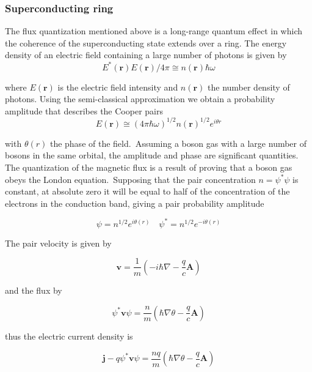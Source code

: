 \documentclass[openany,11pt,a4paper]{report}
\begin{document}
\subsubsection{Superconducting ring} 

The flux quantization mentioned above is a long-range quantum effect in which
the coherence of the superconducting state extends over a ring.
The energy density of an electric field containing a large number of photons is given by
\begin{equation}
E^{*}(\mathbf{r}) E(\mathbf{r}) / 4 \pi \cong n(\mathbf{r}) \hbar \omega
\end{equation}

where $E(\textbf{r})$ is the electric field intensity and $n(\textbf{r})$ the number density of photons. Using the semi-classical approximation we obtain a probability amplitude that describes the Cooper pairs
\begin{equation}
E(\mathbf{r}) \cong(4 \pi \hbar \omega)^{1 / 2} n(\mathbf{r})^{1 / 2} e^{i\theta r} 
\end{equation}

with $\theta(r)$ the phase of the field.\
Assuming a boson gas with a large number of bosons in the same orbital, the amplitude and phase are significant quantities. The quantization of the magnetic flux is a result of proving that a boson gas obeys the London equation.\
Supposing that the pair concentration $n=\psi^{*} \psi$ is constant, at absolute zero it will be equal to half of the concentration of the electrons in the conduction band, giving a pair probability amplitude 

\begin{equation}
\psi=n^{1 / 2} e^{i \theta(r)}  \quad \psi^{*}=n^{1 / 2} e^{-i \theta(r)}
\end{equation}

The pair velocity is given by

\begin{equation}
\mathbf{v}=\frac{1}{m}\left(-i \hbar \nabla-\frac{q}{c} \mathbf{A}\right)
\end{equation}

and the flux by

\begin{equation}
\psi^{*} \mathbf{v} \psi=\frac{n}{m}\left(\hbar \nabla \theta-\frac{q}{c} \mathbf{A}\right)
\end{equation}

thus the electric current density is

\begin{equation}
\mathbf{j}-q \psi^{*} \mathbf{v} \psi=\frac{n q}{m}\left(\hbar \nabla \theta-\frac{q}{c} \mathbf{A}\right)
\label{current}
\end{equation}
\end{document}
